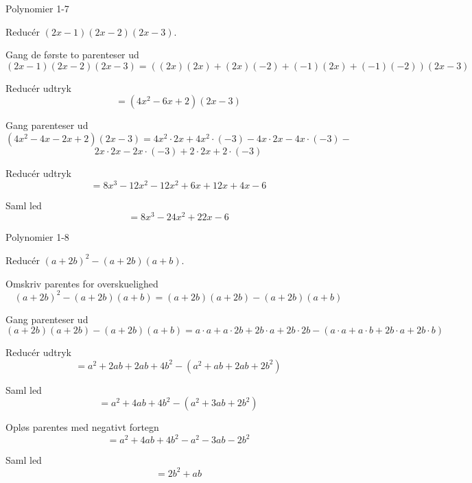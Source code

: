 \documentclass{article}
\begin{document}
\newpage

\begin{exercise}{Polynomier 1-7}

Reducér $(2x - 1)(2x - 2)(2x - 3)$.


\hint

Gang de første to parenteser ud
\[
(2x - 1)(2x - 2)(2x - 3) = ( (2x)(2x) + (2x)(-2) + (-1)(2x) + (-1)(-2) )(2x - 3)
\]

\hint

Reducér udtryk
\[
= (4x^2 - 6x + 2)(2x - 3)
\]

\hint

Gang parenteser ud
\[
(4x^2 - 4x - 2x + 2)(2x - 3) = 4x^2 \cdot 2x + 4x^2 \cdot (-3) -4x \cdot 2x -4x \cdot (-3) -
\]
\[
2x \cdot 2x -2x \cdot (-3) + 2 \cdot 2x + 2 \cdot (-3)
\]

\hint

Reducér udtryk
\[
= 8x^3 - 12x^2 - 12x^2 + 6x + 12x + 4x - 6
\]


\hint

Saml led
\[
= 8x^3 - 24x^2 + 22x - 6
\]

\end{exercise}

\newpage

\begin{exercise}{Polynomier 1-8}

Reducér $(a + 2b)^2 - (a + 2b)(a + b)$.


\hint

Omskriv parentes for overskuelighed
\[
(a + 2b)^2 - (a + 2b)(a + b) = (a + 2b)(a + 2b) - (a + 2b)(a + b)
\]


\hint

Gang parenteser ud
\[
(a + 2b)(a + 2b) - (a + 2b)(a + b)
= a \cdot a + a \cdot 2b + 2b \cdot a + 2b \cdot 2b - (a \cdot a + a \cdot b + 2b \cdot a + 2b \cdot b)
\]

\hint

Reducér udtryk
\[
= a^2 + 2ab + 2ab + 4b^2-(a^2 + ab + 2ab + 2b^2)
\]


\hint

Saml led
\[
= a^2 + 4ab + 4b^2 - (a^2 + 3ab + 2b^2)
\]

\hint

Opløs parentes med negativt fortegn
\[
= a^2 + 4ab + 4b^2 - a^2 - 3ab -2b^2
\]


\hint

Saml led
\[
= 2b^2 + ab
\]

\end{exercise}
\end{document}
